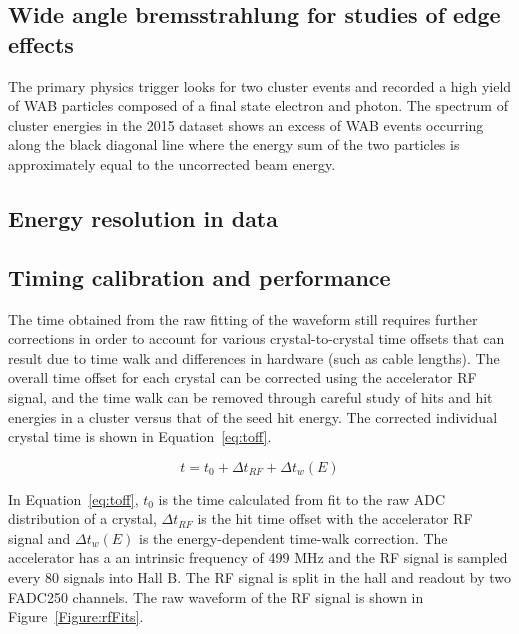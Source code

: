 \documentclass[12pt]{report}
\begin{document}
\subsection{Wide angle bremsstrahlung for studies of edge effects}

The primary physics trigger looks for two cluster events and recorded a high yield of WAB particles composed of a final state electron and photon. The spectrum of cluster energies in the 2015 dataset shows an excess of WAB events occurring along the black diagonal line where the energy sum of the two particles is approximately equal to the uncorrected beam energy.  


\subsection{Energy resolution in data}



\subsection{Timing calibration and performance}
The time obtained from the raw fitting of the waveform still requires further corrections in order to account for various crystal-to-crystal time offsets that can result due to time walk and differences in hardware (such as cable lengths). The overall time offset for each crystal can be corrected using the accelerator RF signal, and the time walk can be removed through careful study of hits and hit energies in a cluster versus that of the seed hit energy. The corrected individual crystal time is shown in Equation~\eqref{eq:toff}.

\begin{equation}
	\label{eq:toff}
	t = t_0 +\Delta t_{RF} + \Delta t_w (E)
\end{equation}

In Equation~\eqref{eq:toff}, $t_0$ is the time calculated from fit to the raw ADC distribution of a crystal, $\Delta t_{RF}$ is the hit time offset with the accelerator RF signal and $\Delta t_w(E)$ is the energy-dependent time-walk correction. The accelerator has a an intrinsic frequency of 499 MHz and the RF signal is sampled every 80 signals into Hall B. The RF signal is split in the hall and readout by two FADC250 channels. The raw waveform of the RF signal is shown in Figure~\ref{Figure:rfFits}. 
\end{document}
